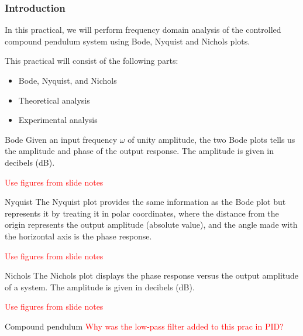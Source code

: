 \documentclass[9pt]{beamer-control}
\begin{document}

\begin{frame}
\frametitle{Introduction}
In this practical, we will perform frequency domain analysis of the controlled compound pendulum system using Bode, Nyquist and Nichols plots.

\vfill

This practical will consist of the following parts:
\begin{itemize}
\item Bode, Nyquist, and Nichols
\item Theoretical analysis
\item Experimental analysis
\end{itemize}
\end{frame}


\begin{frame}{Bode}
Given an input frequency $\omega$ of unity amplitude, the two Bode plots tells us the amplitude and phase of the output response. The amplitude is given in decibels (dB).

\textcolor{red}{Use figures from slide notes}
\end{frame}


\begin{frame}{Nyquist}
The Nyquist plot provides the same information as the Bode plot but represents it by treating it in polar coordinates, where the distance from the origin represents the output amplitude (absolute value), and the angle made with the horizontal axis is the phase response.

\textcolor{red}{Use figures from slide notes}
\end{frame}

\begin{frame}{Nichols}
The Nichols plot displays the phase response versus the output amplitude of a system. The amplitude is given in decibels (dB).

	\textcolor{red}{Use figures from slide notes}
\end{frame}




\begin{frame}{Compound pendulum}
\textcolor{red}{Why was the low-pass filter added to this prac in PID?}
\end{frame}
\end{document}

